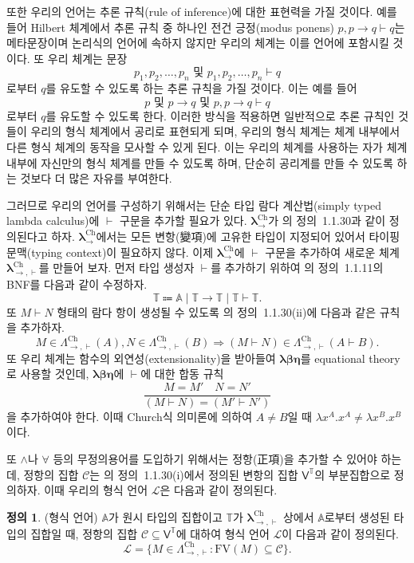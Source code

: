 \documentclass[10pt,twocolumn]{article}
\theoremstyle{definition}
\newtheorem{definition}[theorem]{정의}
\newcommand{\lch}{\bm\lambda_\to^{\text{Ch}}}
\newcommand{\lchh}{\bm\lambda_{\to,\vdash}^{\text{Ch}}}
\newcommand{\Lchh}{\Lambda_{\to,\vdash}^{\text{Ch}}}
\begin{document}
또한 우리의 언어는 추론 규칙(rule of inference)에 대한 표현력을 가질 것이다. 예를 들어 Hilbert 체계에서 추론 규칙 중 하나인 전건 긍정(modus ponens) $p, p\to q\vdash q$는 메타문장이며 논리식의 언어에 속하지 않지만 우리의 체계는 이를 언어에 포함시킬 것이다. 또 우리 체계는 문장
$$p_1,p_2,\ldots,p_n\text{\ \ 및\ \ }p_1, p_2, \ldots, p_n\vdash q$$
로부터 $q$를 유도할 수 있도록 하는 추론 규칙을 가질 것이다. 이는 예를 들어
$$p\text{\ \ 및\ \ }p\to q\text{\ \ 및\ \ }p, p\to q\vdash q$$
로부터 $q$를 유도할 수 있도록 한다. 이러한 방식을 적용하면 일반적으로 추론 규칙인 것들이 우리의 형식 체계에서 공리로 표현되게 되며, 우리의 형식 체계는 체계 내부에서 다른 형식 체계의 동작을 모사할 수 있게 된다. 이는 우리의 체계를 사용하는 자가 체계 내부에 자신만의 형식 체계를 만들 수 있도록 하며, 단순히 공리계를 만들 수 있도록 하는 것보다 더 많은 자유를 부여한다.

그러므로 우리의 언어를 구성하기 위해서는 단순 타입 람다 계산법(simply typed lambda calculus)에 $\vdash$ 구문을 추가할 필요가 있다. $\lch$가 \cite{luswt}의 정의~1.1.30과 같이 정의된다고 하자. $\lch$에서는 모든 변항(變項)에 고유한 타입이 지정되어 있어서 타이핑 문맥(typing context)이 필요하지 않다. 이제 $\lch$에 $\vdash$ 구문을 추가하여 새로운 체계 $\lchh$를 만들어 보자. 먼저 타입 생성자 $\vdash$를 추가하기 위하여 \cite{luswt}의 정의~1.1.11의 BNF를 다음과 같이 수정하자.
$$\mathds T \Coloneqq \mathbb A\mid\mathds T\to\mathds T\mid\mathds T\vdash\mathds T.$$
또 $M\vdash N$ 형태의 람다 항이 생성될 수 있도록 \cite{luswt}의 정의~1.1.30(ii)에 다음과 같은 규칙을 추가하자.
$$M\in\Lchh(A), N\in\Lchh(B)\Rightarrow (M\vdash N)\in\Lchh(A\vdash B).$$
또 우리 체계는 함수의 외연성(extensionality)을 받아들여 $\bm{\lambda\beta\eta}$를 equational theory로 사용할 것인데, $\bm{\lambda\beta\eta}$에 $\vdash$에 대한 합동 규칙
$$\dfrac{M=M'\quad N=N'}{(M\vdash N)=(M'\vdash N')}$$
을 추가하여야 한다. 이때 Church식 의미론에 의하여 $A\ne B$일 때 $\lambda x^A.x^A\ne\lambda x^B.x^B$이다.

또 $\land$나 $\forall$ 등의 무정의용어를 도입하기 위해서는 정항(正項)을 추가할 수 있어야 하는데, 정항의 집합 $\mathcal C$는 \cite{luswt}의 정의~1.1.30(i)에서 정의된 변항의 집합 $\mathsf V^{\mathds T}$의 부분집합으로 정의하자. 이때 우리의 형식 언어 $\mathcal L$은 다음과 같이 정의된다.

\begin{definition}(형식 언어)
	$\mathbb A$가 원시 타입의 집합이고 $\mathds T$가 $\lchh$ 상에서 $\mathbb A$로부터 생성된 타입의 집합일 때, 정항의 집합 $\mathcal C\subseteq \mathsf V^{\mathds T}$에 대하여 형식 언어 $\mathcal L$이 다음과 같이 정의된다.
	$$\mathcal L = \{M\in\Lchh: \mathrm{FV}(M)\subseteq\mathcal C\}.$$
\end{definition}
\end{document}
